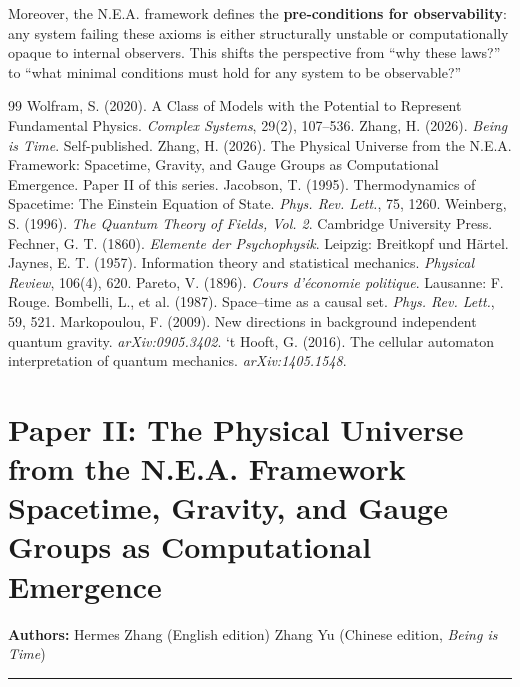 \documentclass{article}
\begin{document}
Moreover, the N.E.A. framework defines the \textbf{pre‑conditions for observability}: any system failing these axioms is either structurally unstable or computationally opaque to internal observers. This shifts the perspective from “why these laws?” to “what minimal conditions must hold for any system to be observable?”

\begin{thebibliography}{99}
 Wolfram, S. (2020). A Class of Models with the Potential to Represent Fundamental Physics. \textit{Complex Systems}, 29(2), 107–536.
 Zhang, H. (2026). \textit{Being is Time}. Self-published.
 Zhang, H. (2026). The Physical Universe from the N.E.A. Framework: Spacetime, Gravity, and Gauge Groups as Computational Emergence. Paper II of this series.
 Jacobson, T. (1995). Thermodynamics of Spacetime: The Einstein Equation of State. \textit{Phys. Rev. Lett.}, 75, 1260.
 Weinberg, S. (1996). \textit{The Quantum Theory of Fields, Vol. 2}. Cambridge University Press.
 Fechner, G. T. (1860). \textit{Elemente der Psychophysik}. Leipzig: Breitkopf und Härtel.
 Jaynes, E. T. (1957). Information theory and statistical mechanics. \textit{Physical Review}, 106(4), 620.
 Pareto, V. (1896). \textit{Cours d’économie politique}. Lausanne: F. Rouge.
 Bombelli, L., et al. (1987). Space–time as a causal set. \textit{Phys. Rev. Lett.}, 59, 521.
 Markopoulou, F. (2009). New directions in background independent quantum gravity. \textit{arXiv:0905.3402}.
 ‘t Hooft, G. (2016). The cellular automaton interpretation of quantum mechanics. \textit{arXiv:1405.1548}.
\end{thebibliography}

\newpage

\section*{Paper II: The Physical Universe from the N.E.A. Framework\\
\large Spacetime, Gravity, and Gauge Groups as Computational Emergence}
\vspace{0.5cm}

\textbf{Authors:} Hermes Zhang (English edition) \quad Zhang Yu (Chinese edition, \textit{Being is Time})

\vspace{0.5cm}
\noindent\rule{\textwidth}{0.4pt}
\vspace{0.5cm}
\end{document}
